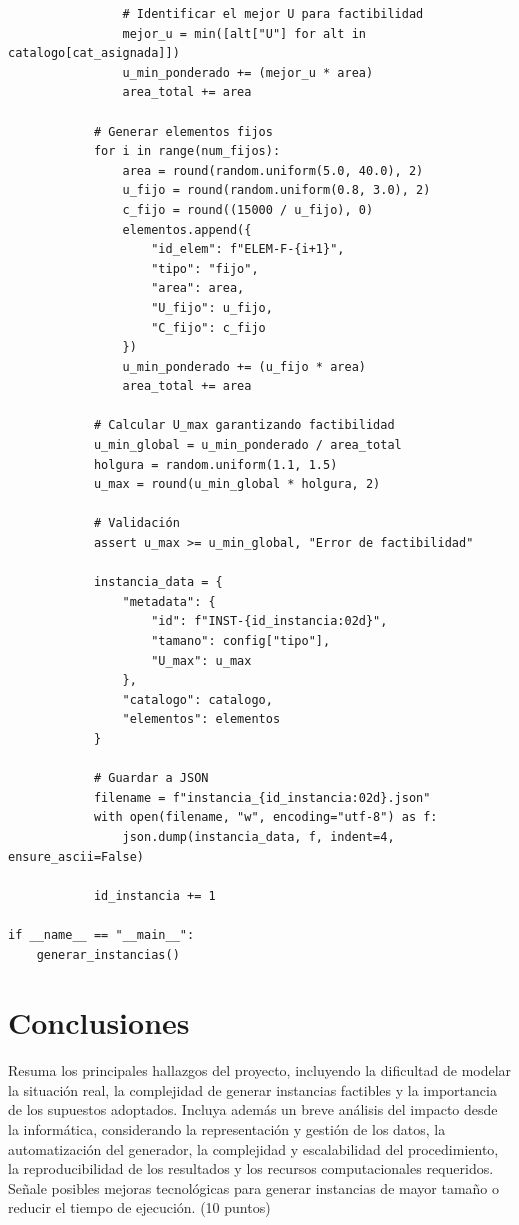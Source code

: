\documentclass[journal, 12pt, onecolumn]{IEEEtran}
\begin{document}
\begin{lstlisting}
                # Identificar el mejor U para factibilidad
                mejor_u = min([alt["U"] for alt in catalogo[cat_asignada]])
                u_min_ponderado += (mejor_u * area)
                area_total += area
                
            # Generar elementos fijos
            for i in range(num_fijos):
                area = round(random.uniform(5.0, 40.0), 2)
                u_fijo = round(random.uniform(0.8, 3.0), 2)
                c_fijo = round((15000 / u_fijo), 0)
                elementos.append({
                    "id_elem": f"ELEM-F-{i+1}",
                    "tipo": "fijo",
                    "area": area,
                    "U_fijo": u_fijo,
                    "C_fijo": c_fijo
                })
                u_min_ponderado += (u_fijo * area)
                area_total += area
                
            # Calcular U_max garantizando factibilidad
            u_min_global = u_min_ponderado / area_total
            holgura = random.uniform(1.1, 1.5)
            u_max = round(u_min_global * holgura, 2)
            
            # Validación
            assert u_max >= u_min_global, "Error de factibilidad"
            
            instancia_data = {
                "metadata": {
                    "id": f"INST-{id_instancia:02d}",
                    "tamano": config["tipo"],
                    "U_max": u_max
                },
                "catalogo": catalogo,
                "elementos": elementos
            }
            
            # Guardar a JSON
            filename = f"instancia_{id_instancia:02d}.json"
            with open(filename, "w", encoding="utf-8") as f:
                json.dump(instancia_data, f, indent=4, ensure_ascii=False)
                
            id_instancia += 1

if __name__ == "__main__":
    generar_instancias()
\end{lstlisting}

\section{Conclusiones}
Resuma los principales hallazgos del proyecto, incluyendo la dificultad de
modelar la situación real, la complejidad de generar instancias factibles
y la importancia de los supuestos adoptados. Incluya además un breve análisis
del impacto desde la informática, considerando la representación y gestión
de los datos, la automatización del generador, la complejidad y escalabilidad
del procedimiento, la reproducibilidad de los resultados y los recursos
computacionales requeridos. Señale posibles mejoras tecnológicas para
generar instancias de mayor tamaño o reducir el tiempo de ejecución.
(10 puntos)
\end{document}
